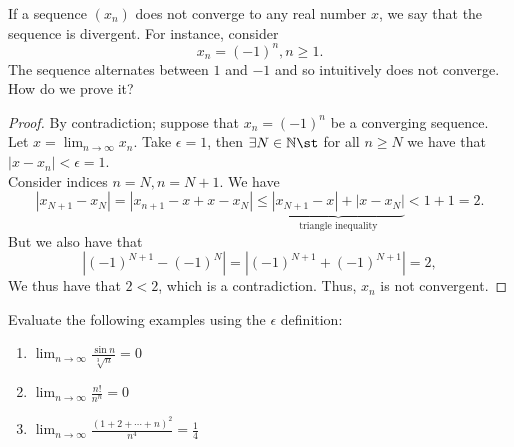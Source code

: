 \documentclass[12pt]{article}
\begin{document}
\begin{definition}
  If a sequence $(x_n)$ does not converge to any real number $x$, we say that the sequence is divergent. For instance, consider \[x_n = (-1)^n, n \geq 1.\] The sequence alternates between $1$ and $-1$ and so intuitively does not converge. How do we prove it?
\end{definition}

\begin{proof}
  By contradiction; suppose that $x_n  = (-1)^n$ be a converging sequence. Let $x = \lim_{n\to \infty}x_n$. Take $\epsilon = 1$, then $\exists N \in \mathbb{N} \st$ for all $n \geq N$ we have that $|x-x_n| < \epsilon = 1$.\\
  Consider indices $n = N, n = N+1$. We have \[|x_{N+1} - x_N| = |x_{n+1} - x + x - x_N| \leq \underbrace{|x_{N+1} -x| + |x - x_N|}_{\text{triangle inequality}} < 1 + 1 = 2.\] But we also have that $$|(-1)^{N+1}-(-1)^N| = |(-1)^{N+1}+(-1)^{N+1}| = 2,$$ We thus have that $2 < 2$, which is a contradiction. Thus, $x_n$ is not convergent.
\end{proof}

\begin{example}
  Evaluate the following examples using the $\epsilon$ definition:
  \begin{enumerate}
    \item $\lim_{n\to\infty} \frac{\sin n}{\sqrt[3]{n}} = 0$
    \item $\lim_{n\to\infty} \frac{n!}{n^n} = 0$
    \item $\lim_{n\to\infty} \frac{(1+2+\cdots + n)^2}{n^4} = \frac{1}{4}$
  \end{enumerate}
\end{example}
\end{document}
